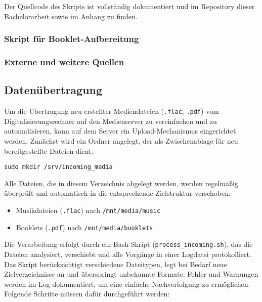 \documentclass[12pt,a4paper]{report}
\begin{document}
  Der Quellcode des Skripts ist vollständig dokumentiert und im Repository dieser Bachelorarbeit 
  sowie im Anhang zu finden.

  \subsubsection*{Skript für Booklet-Aufbereitung}
  \subsubsection*{Externe und weitere Quellen}

  \subsection{Datenübertragung}
  Um die Übertragung neu erstellter Mediendateien (\texttt{.flac}, \texttt{.pdf}) vom Digitalisierungsrechner auf den Medienserver zu vereinfachen 
  und zu automatisieren, kann auf dem Server ein Upload-Mechanismus eingerichtet werden. 
  Zunächst wird ein Ordner angelegt, der als Zwischenablage für neu bereitgestellte Dateien dient. 

  \begin{verbatim}
sudo mkdir /srv/incoming_media
  \end{verbatim}

  Alle Dateien, die in diesem Verzeichnis abgelegt werden, werden regelmäßig überprüft 
  und automatisch in die entsprechende Zielstruktur verschoben:
  \begin{itemize}
    \item Musikdateien (\texttt{.flac}) nach \texttt{/mnt/media/music}
    \item Booklets (\texttt{.pdf}) nach \texttt{/mnt/media/booklets}
  \end{itemize}

  Die Verarbeitung erfolgt durch ein Bash-Skript (\texttt{process\_incoming.sh}), das die Dateien analysiert, 
  verschiebt und alle Vorgänge in einer Logdatei protokolliert. 
  Das Skript berücksichtigt verschiedene Dateitypen, legt bei Bedarf neue Zielverzeichnisse an und überspringt unbekannte Formate. 
  Fehler und Warnungen werden im Log dokumentiert, um eine einfache Nachverfolgung zu ermöglichen.
  Folgende Schritte müssen dafür durchgeführt werden:
\end{document}
